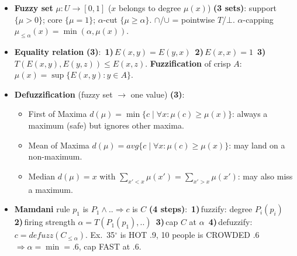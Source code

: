 \documentclass[10pt]{article}
\newcommand{\kw}[1]{\textbf{#1}}
\newcommand{\cnt}[1]{{\color{h2}\bfseries(#1)}}
\newcommand{\n}[1]{\,{\color{h2}\bfseries#1)}\,}
\begin{document}
\begin{multicols*}{4}
\begin{itemize}
\begin{itemize}
\item Solution \cnt{3}: \n1every value $\ge$ its initial value \n2all rules satisfied \n3no output can be smaller.
\item Algorithm: repeat ``raise $C$ to $\phi$(premises)'' over the rules, any order, until nothing changes ($\phi$ monotone, continuous).
\item Negated premises/conclusions: may have no solution or oscillate.
\end{itemize}
\item \kw{Fuzzy set} $\mu:U\to[0,1]$ ($x$ belongs to degree $\mu(x)$) \cnt{3 sets}: support $\{\mu>0\}$; core $\{\mu=1\}$; $\alpha$-cut $\{\mu\ge\alpha\}$. $\cap$/$\cup$ = pointwise $T$/$\bot$. $\alpha$-capping $\mu_{\le\alpha}(x)=\min(\alpha,\mu(x))$.
\item \kw{Equality relation} \cnt{3}: \n1$E(x,y)=E(y,x)$ \n2$E(x,x)=1$ \n3$T(E(x,y),E(y,z))\le E(x,z)$. \kw{Fuzzification} of crisp $A$: $\mu(x)=\sup\{E(x,y):y\in A\}$.
\item \kw{Defuzzification} (fuzzy set $\to$ one value) \cnt{3}:
\begin{itemize}
\item First of Maxima $d(\mu)=\min\{c\mid\forall x:\mu(c)\ge\mu(x)\}$: always a maximum (safe) but ignores other maxima.
\item Mean of Maxima $d(\mu)=avg\{c\mid\forall x:\mu(c)\ge\mu(x)\}$: may land on a non-maximum.
\item Median $d(\mu)=x$ with $\sum_{x'<x}\mu(x')=\sum_{x'>x}\mu(x')$: may also miss a maximum.
\end{itemize}
\item \kw{Mamdani} rule $p_1$ is $P_1\wedge..\Rightarrow c$ is $C$ \cnt{4 steps}: \n1fuzzify: degree $P_i(p_i)$ \n2firing strength $\alpha=T(P_1(p_1),..)$ \n3cap $C$ at $\alpha$ \n4defuzzify: $c=defuzz(C_{\le\alpha})$. Ex.\ 35$^\circ$ is HOT .9, 10 people is CROWDED .6 $\Rightarrow\alpha=\min=.6$, cap FAST at .6.
\end{itemize}


\end{multicols*}
\end{document}
